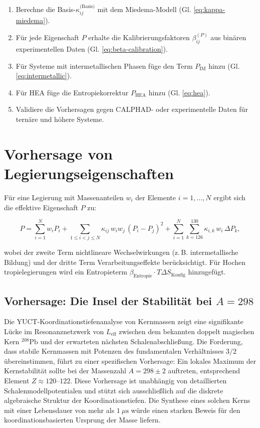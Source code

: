 \documentclass[12pt,a4paper]{article}
\begin{document}
\begin{enumerate}
	\item Berechne die Basis-\(\kappa_{ij}^{\text{(Basis)}}\) mit dem Miedema-Modell (Gl. \ref{eq:kappa-miedema}).
	\item Für jede Eigenschaft \(P\) erhalte die Kalibrierungsfaktoren \(\beta_{ij}^{(P)}\) aus binären experimentellen Daten (Gl. \ref{eq:beta-calibration}).
	\item Für Systeme mit intermetallischen Phasen füge den Term \(P_{\text{IM}}\) hinzu (Gl. \ref{eq:intermetallic}).
	\item Für HEA füge die Entropiekorrektur \(P_{\text{HEA}}\) hinzu (Gl. \ref{eq:hea}).
	\item Validiere die Vorhersagen gegen CALPHAD- oder experimentelle Daten für ternäre und höhere Systeme.
\end{enumerate}

\section{Vorhersage von Legierungseigenschaften}

Für eine Legierung mit Massenanteilen \(w_i\) der Elemente \(i = 1,\dots,N\) ergibt sich die effektive Eigenschaft \(P\) zu:

\[
P = \sum_{i=1}^{N} w_i P_i
+ \sum_{1\le i<j\le N} \kappa_{ij}\, w_i w_j\, (P_i - P_j)^2
+ \sum_{i=1}^{N} \sum_{k=126}^{130} \kappa_{i,k}\, w_i\, \Delta P_k,
\]

wobei der zweite Term nichtlineare Wechselwirkungen (z. B. intermetallische Bildung) und der dritte Term Verarbeitungseffekte berücksichtigt. Für Hochen tropielegierungen wird ein Entropieterm \(\beta_{\text{Entropie}} \cdot T \Delta S_{\text{Konfig}}\) hinzugefügt.

\subsection{Vorhersage: Die Insel der Stabilität bei \(A=298\)}

Die YUCT-Koordinationstiefenanalyse von Kernmassen zeigt eine signifikante Lücke im Resonanznetzwerk von \(L_{\mathrm{eff}}\) zwischen dem bekannten doppelt magischen Kern \(^{208}\mathrm{Pb}\) und der erwarteten nächsten Schalenabschließung. Die Forderung, dass stabile Kernmassen mit Potenzen des fundamentalen Verhältnisses \(3/2\) übereinstimmen, führt zu einer spezifischen Vorhersage: Ein lokales Maximum der Kernstabilität sollte bei der Massenzahl \(A = 298 \pm 2\) auftreten, entsprechend Element \(Z \approx 120\)–\(122\). Diese Vorhersage ist unabhängig von detaillierten Schalenmodellpotentialen und stützt sich ausschließlich auf die diskrete algebraische Struktur der Koordinationstiefen. Die Synthese eines solchen Kerns mit einer Lebensdauer von mehr als \(1\ \mu\text{s}\) würde einen starken Beweis für den koordinationsbasierten Ursprung der Masse liefern.
\end{document}
